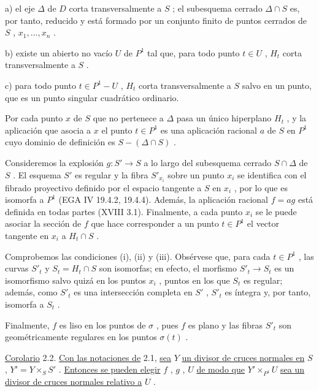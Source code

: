 a) el eje  $\Delta$  de  $D$  corta transversalmente a  $S$ ; el subesquema cerrado  $\Delta \cap S$  es, por tanto, reducido y está formado por un conjunto finito de puntos cerrados de  $S$ , $x_1,...,x_n$ .

b) existe un abierto no vacío  $U$  de  $P^1$  tal que, para todo punto  $t \in U$ , $H_t$  corta transversalmente a  $S$ .

c) para todo punto  $t \in P^1-U$ , $H_t$  corta transversalmente a  $S$  salvo en un punto, que es un punto singular cuadrático ordinario.

Por cada punto  $x$  de  $S$  que no pertenece a  $\Delta$  pasa un único hiperplano  $H_t$ , y la aplicación que asocia a  $x$  el punto  $t \in P^1$  es una aplicación racional  $a$  de  $S$  en  $P^1$  cuyo dominio de definición es  $S-(\Delta \cap S)$ .

Consideremos la explosión  $g : S' \longrightarrow S$  a lo largo del subesquema cerrado  $S \cap \Delta$  de  $S$ . El esquema  $S'$  es regular y la fibra  $S'_{x_i}$  sobre un punto  $x_i$  se identifica con el fibrado proyectivo definido por el espacio tangente a  $S$  en  $x_i$ , por lo que es isomorfa a  $P^1$  (EGA IV 19.4.2, 19.4.4). Además, la aplicación racional  $f = ag$  está definida en todas partes (XVIII 3.1). Finalmente, a cada punto  $x_i$  se le puede asociar la sección de  $f$  que hace corresponder a un punto  $t \in P^1$  el vector tangente en  $x_i$  a  $H_t \cap S$ .

Comprobemos las condiciones (i), (ii) y (iii). Obsérvese que, para cada  $t \in P^1$ , las curvas  $S'_t$  y  $S_t = H_t \cap S$  son isomorfas; en efecto, el morfismo  $S'_t \longrightarrow S_t$  es un isomorfismo salvo quizá en los puntos  $x_i$ , puntos en los que  $S_t$  es regular; además, como  $S'_t$  es una intersección completa en  $S'$ , $S'_t$  es íntegra y, por tanto, isomorfa a  $S_t$ .

 Finalmente,  $f$  es liso en los puntos de  $\sigma$ , pues  $f$  es plano y las fibras  $S'_t$  son geométricamente regulares en los puntos  $\sigma(t)$ .



\underline{Corolario} 2.2. \underline{Con las notaciones de} 2.1, \underline{sea} $Y$ \underline{un divisor de cruces normales en} $S$ , $Y' = Y \times_S S'$ . \underline{Entonces se pueden elegir} $f$ , $g$ , $U$ \underline{de modo que} $Y'\times_{P^1}U$ \underline{sea un divisor de cruces normales relativo a} $U$ .

